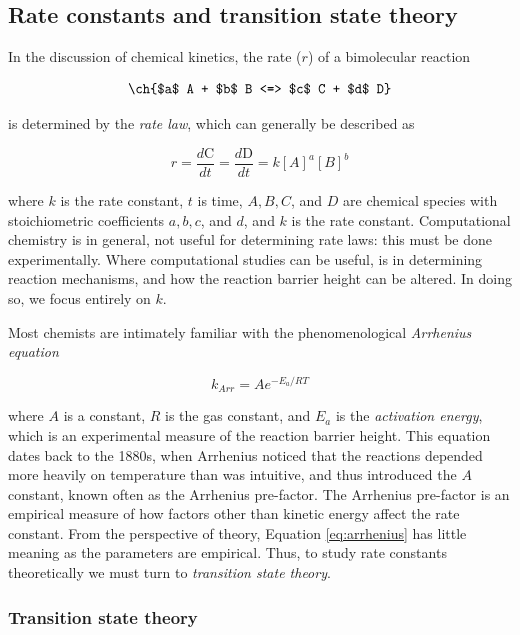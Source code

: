 \subsection{Rate constants and transition state theory}

In the discussion of chemical kinetics, the rate ($r$) of a bimolecular reaction

\begin{equation}
  \ch{$a$ A + $b$ B <=> $c$ C + $d$ D}
  \label{eq:a}
\end{equation}

\noindent is determined by the \emph{rate law}, which can generally be described as

\begin{equation}
  r = \frac{d \text{C}}{dt} =\frac{d \text{D}}{dt} = k[A]^a[B]^b
\end{equation}

\noindent where $k$ is the rate constant, $t$ is time, $A, B, C$, and $D$ are
chemical species with stoichiometric coefficients $a, b, c$, and $d$, and $k$ is
the rate constant. Computational chemistry is in general, not useful for
determining rate laws: this must be done experimentally. Where computational
studies can be useful, is in determining reaction mechanisms, and how the
reaction barrier height can be altered. In doing so, we focus entirely on $k$.

Most chemists are intimately familiar with the phenomenological \emph{Arrhenius
  equation}

\begin{equation}
  k_{Arr} = Ae^{-E_a/RT}
\label{eq:arrhenius}
\end{equation}

\noindent where $A$ is a constant, $R$ is the gas constant, and $E_a$ is the
\emph{activation energy}, which is an experimental measure of the reaction
barrier height. This equation dates back to the 1880s, when Arrhenius noticed
that the reactions depended more heavily on temperature than was intuitive, and
thus introduced the $A$ constant, known often as the Arrhenius
pre-factor.\cite{McQuarrie1997} The Arrhenius pre-factor is an empirical measure
of how factors other than kinetic energy affect the rate constant. From the
perspective of theory, Equation \ref{eq:arrhenius} has little meaning as the
parameters are empirical. Thus, to study rate constants theoretically we must
turn to \emph{transition state theory}.

\subsubsection{Transition state theory}


